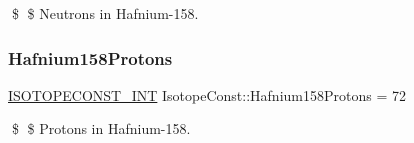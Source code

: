 \$ \$ Neutrons in Hafnium-\/158. \mbox{\label{group___isotope_const-_hafnium-_hf158_ga5ad26ee86c44a0895b4e6745835431a5}} 
\subsubsection{\texorpdfstring{Hafnium158\+Protons}{Hafnium158Protons}}
{\footnotesize\ttfamily \mbox{\hyperlink{group___isotope_const-_macros_ga5f18360b3e99483a35c32d789e62621c}{I\+S\+O\+T\+O\+P\+E\+C\+O\+N\+S\+T\+\_\+\+I\+NT}} Isotope\+Const\+::\+Hafnium158\+Protons = 72}

\$ \$ Protons in Hafnium-\/158. 